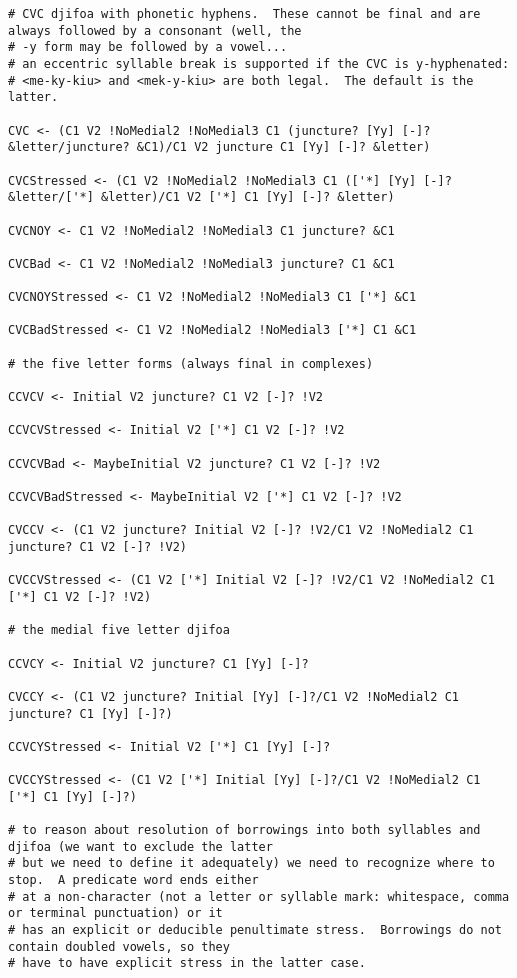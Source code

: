 \documentclass[12pt]{book}
\begin{document}
{\begin{verbatim}
# CVC djifoa with phonetic hyphens.  These cannot be final and are always followed by a consonant (well, the
# -y form may be followed by a vowel...
# an eccentric syllable break is supported if the CVC is y-hyphenated:
# <me-ky-kiu> and <mek-y-kiu> are both legal.  The default is the latter.

CVC <- (C1 V2 !NoMedial2 !NoMedial3 C1 (juncture? [Yy] [-]? &letter/juncture? &C1)/C1 V2 juncture C1 [Yy] [-]? &letter)

CVCStressed <- (C1 V2 !NoMedial2 !NoMedial3 C1 (['*] [Yy] [-]? &letter/['*] &letter)/C1 V2 ['*] C1 [Yy] [-]? &letter)

CVCNOY <- C1 V2 !NoMedial2 !NoMedial3 C1 juncture? &C1

CVCBad <- C1 V2 !NoMedial2 !NoMedial3 juncture? C1 &C1

CVCNOYStressed <- C1 V2 !NoMedial2 !NoMedial3 C1 ['*] &C1

CVCBadStressed <- C1 V2 !NoMedial2 !NoMedial3 ['*] C1 &C1

# the five letter forms (always final in complexes)

CCVCV <- Initial V2 juncture? C1 V2 [-]? !V2

CCVCVStressed <- Initial V2 ['*] C1 V2 [-]? !V2

CCVCVBad <- MaybeInitial V2 juncture? C1 V2 [-]? !V2

CCVCVBadStressed <- MaybeInitial V2 ['*] C1 V2 [-]? !V2

CVCCV <- (C1 V2 juncture? Initial V2 [-]? !V2/C1 V2 !NoMedial2 C1 juncture? C1 V2 [-]? !V2)

CVCCVStressed <- (C1 V2 ['*] Initial V2 [-]? !V2/C1 V2 !NoMedial2 C1 ['*] C1 V2 [-]? !V2)

# the medial five letter djifoa

CCVCY <- Initial V2 juncture? C1 [Yy] [-]?

CVCCY <- (C1 V2 juncture? Initial [Yy] [-]?/C1 V2 !NoMedial2 C1 juncture? C1 [Yy] [-]?)

CCVCYStressed <- Initial V2 ['*] C1 [Yy] [-]?

CVCCYStressed <- (C1 V2 ['*] Initial [Yy] [-]?/C1 V2 !NoMedial2 C1 ['*] C1 [Yy] [-]?)

# to reason about resolution of borrowings into both syllables and djifoa (we want to exclude the latter
# but we need to define it adequately) we need to recognize where to stop.  A predicate word ends either
# at a non-character (not a letter or syllable mark: whitespace, comma or terminal punctuation) or it
# has an explicit or deducible penultimate stress.  Borrowings do not contain doubled vowels, so they
# have to have explicit stress in the latter case.


\end{verbatim}}
\end{document}
